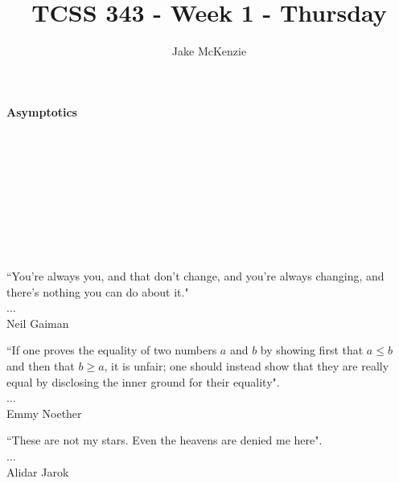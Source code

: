 \documentclass[12pt]{article}
\begin{document}
\title{TCSS 343 - Week 1 - Thursday}
\author{Jake McKenzie}
\maketitle
\noindent\centerline{\textbf{Asymptotics}}\\\\\\\\\\\\\\\\
\begin{center}
    ``You're always you, and that don't change, and you're always changing, and there's nothing you can do about it." \\$\dots$\\ Neil Gaiman
\end{center}
\begin{center}
    ``If one proves the equality of two numbers $a$ and $b$ by showing first that $a \leq b$ and then that $b \geq a$, it is unfair; one should instead show that they are really equal by disclosing the inner ground for their equality". \\$\dots$\\Emmy Noether
\end{center}
\begin{center}
    ``These are not my stars. Even the heavens are denied me here". \\$\dots$\\Alidar Jarok
\end{center}
\newpage
\end{document}
